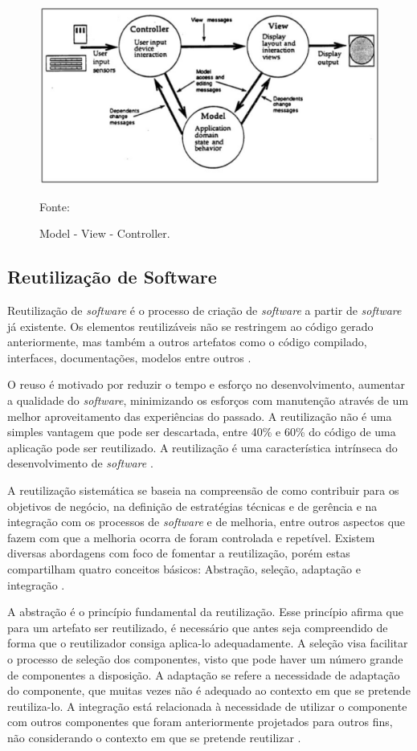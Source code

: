 \begin{figure}[h!]
	\centering
  	\includegraphics[width=.9\linewidth]{figuras/mvc.eps}
  	\caption{Model - View - Controller.}
	\small{Fonte: \cite{krasner1988}}
  	\label{fig:mvc}
\end{figure} 

\subsection{Reutilização de Software}

Reutilização de \textit{software} é o processo de criação de \textit{software} a partir de \textit{software} já existente. Os elementos reutilizáveis não se restringem ao código gerado anteriormente, mas também a outros artefatos como o código compilado, interfaces, documentações, modelos entre outros \cite{krueger1992, dsouza1999}.

O reuso é motivado por reduzir o tempo e esforço no desenvolvimento, aumentar a qualidade do \textit{software}, minimizando os esforços com manutenção através de um melhor aproveitamento das experiências do passado. A reutilização não é uma simples vantagem que pode ser descartada, entre 40\% e 60\% do código de uma aplicação pode ser reutilizado. A reutilização é uma característica intrínseca do desenvolvimento de \textit{software} \cite{lucredio2009}.

A reutilização sistemática se baseia na compreensão de como contribuir para os objetivos de negócio, na definição de estratégias técnicas e de gerência e na integração com os processos de \textit{software} e de melhoria, entre outros aspectos que fazem com que a melhoria ocorra de foram controlada e repetível. Existem diversas abordagens com foco de fomentar a reutilização, porém estas compartilham quatro conceitos básicos: Abstração, seleção, adaptação e integração \cite{krueger1992, ezran2002, lucredio2009}.

A abstração é o princípio fundamental da reutilização. Esse princípio afirma que para um artefato ser reutilizado, é necessário que antes seja compreendido de forma que o reutilizador consiga aplica-lo adequadamente. A seleção visa facilitar o processo de seleção dos componentes, visto que pode haver um número grande de componentes a disposição. A adaptação se refere a necessidade de adaptação do componente, que muitas vezes não é adequado ao contexto em que se pretende reutiliza-lo. A integração está relacionada à necessidade de utilizar o componente com outros componentes que foram anteriormente projetados para outros fins, não considerando o contexto em que se pretende reutilizar \cite{krueger1992}.